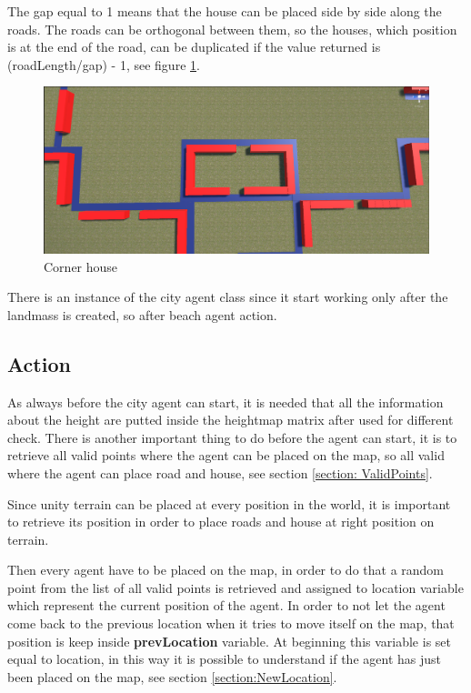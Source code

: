 \documentclass[12pt]{article}
\begin{document}
\begin{itemize}
        The gap equal to 1 means that the house can be placed side by side along the roads. The roads can be orthogonal between them, so the houses, which position is 
        at the end of the road, can be duplicated if the value returned is (roadLength/gap) - 1, see figure \ref{fig:cornerHouse}.
        
        \begin{figure}
            \centering
            \includegraphics[scale = 0.19]{images/Corner house.png}
            \caption{Corner house}
            \label{fig:cornerHouse}
        \end{figure}
        
    \end{itemize}

    There is an instance of the city agent class since it start working only after the landmass is created, so after beach agent action.

    \subsection{Action} \label{seciton:action}
    As always before the city agent can start, it is needed that all the information about the height are putted inside the heightmap matrix after used
    for different check. There is another important thing to do before the agent can start, it is to retrieve all valid points where the agent can be placed on the
    map, so all valid where the agent can place road and house, see section \ref{section: ValidPoints}.

    Since unity terrain can be placed at every position in the world, it is important to retrieve its position in order to place roads and house at right position on 
    terrain.

    Then every agent have to be placed on the map, in order to do that a random point from the list of all valid points is retrieved and assigned to location variable
    which represent the current position of the agent. In order to not let the agent come back to the previous location when it tries to move itself on the map, that
    position is keep inside \textbf{prevLocation} variable. At beginning this variable is set equal to location, in this way it is possible to understand if the agent
    has just been placed on the map, see section \ref{section:NewLocation}.
\end{document}
